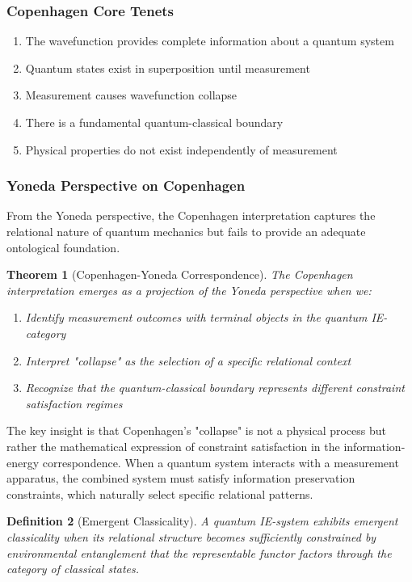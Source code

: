 \documentclass[12pt,a4paper]{article}
\newtheorem{theorem}{Theorem}[section]
\newtheorem{definition}[theorem]{Definition}
\begin{document}
\subsubsection{Copenhagen Core Tenets}
\begin{enumerate}
\item The wavefunction provides complete information about a quantum system
\item Quantum states exist in superposition until measurement
\item Measurement causes wavefunction collapse
\item There is a fundamental quantum-classical boundary
\item Physical properties do not exist independently of measurement
\end{enumerate}

\subsubsection{Yoneda Perspective on Copenhagen}

From the Yoneda perspective, the Copenhagen interpretation captures the relational nature of quantum mechanics but fails to provide an adequate ontological foundation.

\begin{theorem}[Copenhagen-Yoneda Correspondence]
The Copenhagen interpretation emerges as a projection of the Yoneda perspective when we:
\begin{enumerate}
\item Identify measurement outcomes with terminal objects in the quantum IE-category
\item Interpret "collapse" as the selection of a specific relational context
\item Recognize that the quantum-classical boundary represents different constraint satisfaction regimes
\end{enumerate}
\end{theorem}

The key insight is that Copenhagen's "collapse" is not a physical process but rather the mathematical expression of constraint satisfaction in the information-energy correspondence. When a quantum system interacts with a measurement apparatus, the combined system must satisfy information preservation constraints, which naturally select specific relational patterns.

\begin{definition}[Emergent Classicality]
A quantum IE-system exhibits emergent classicality when its relational structure becomes sufficiently constrained by environmental entanglement that the representable functor factors through the category of classical states.
\end{definition}
\end{document}
